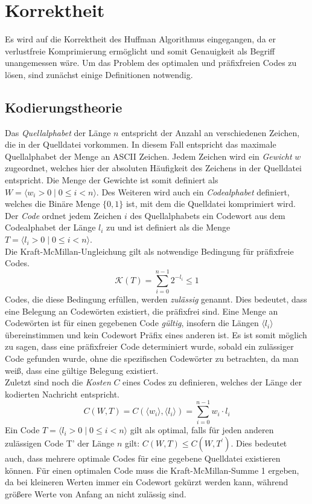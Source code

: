 \documentclass[course=erap]{aspdoc}
\begin{document}
\section{Korrektheit}
Es wird auf die Korrektheit des Huffman Algorithmus eingegangen, da er verlustfreie Komprimierung ermöglicht und somit Genauigkeit als Begriff unangemessen wäre.
Um das Problem des optimalen und präfixfreien Codes zu lösen, sind zunächst einige Definitionen notwendig.

\subsection{Kodierungstheorie}

Das \textit{Quellalphabet} der Länge $n$ entspricht der Anzahl an verschiedenen Zeichen, die in der Quelldatei vorkommen. In diesem Fall entspricht das maximale Quellalphabet der Menge an ASCII Zeichen.
Jedem Zeichen wird ein \textit{Gewicht} $w$ zugeordnet, welches hier der absoluten Häufigkeit des Zeichens in der Quelldatei entspricht. Die Menge der Gewichte ist somit definiert als $W = \langle w_i > 0 \mid 0 \le i < n \rangle $.
Des Weiteren wird auch ein \textit{Codealphabet} definiert, welches die Binäre Menge $\lbrace0, 1\rbrace$ ist, mit dem die Quelldatei komprimiert wird.
Der \textit{Code} ordnet jedem Zeichen $i$ des Quellalphabets ein Codewort aus dem Codealphabet der Länge $l_i$ zu und ist definiert als die Menge $T = \langle l_i > 0 \mid 0 \le i < n \rangle$.\\
Die Kraft-McMillan-Ungleichung gilt als notwendige Bedingung für präfixfreie Codes.
$$\mathcal{K}(T) = \sum_{i=0}^{n-1} 2^{-l_i} \le 1$$
Codes, die diese Bedingung erfüllen, werden \textit{zulässig} genannt. Dies bedeutet, dass eine Belegung an Codewörten existiert, die präfixfrei sind.
Eine Menge an Codewörten ist für einen gegebenen Code \textit{gültig}, insofern die Längen $\langle l_i \rangle$ übereinstimmen und kein Codewort Präfix eines anderen ist.
Es ist somit möglich zu sagen, dass eine präfixfreier Code determiniert wurde, sobald ein zulässiger Code gefunden wurde, ohne die spezifischen Codewörter zu betrachten, da man weiß, dass eine gültige Belegung existiert.\\
Zuletzt sind noch die \textit{Kosten} $C$ eines Codes zu definieren, welches der Länge der kodierten Nachricht entspricht.
$$C(W,T) = C(\langle w_i \rangle,\langle l_i \rangle) = \sum_{i=0}^{n-1} w_i \cdot l_i $$
Ein Code $T = \langle l_i > 0 \mid 0 \le i < n \rangle$ gilt als optimal, falls für jeden anderen zulässigen Code T' der Länge $n$ gilt: $C(W,T) \le C(W,T^{\prime})$. Dies bedeutet auch, dass mehrere optimale Codes für eine gegebene Quelldatei existieren können.
Für einen optimalen Code muss die Kraft-McMillan-Summe 1 ergeben, da bei kleineren Werten immer ein Codewort gekürzt werden kann, während größere Werte von Anfang an nicht zulässig sind.
\end{document}
